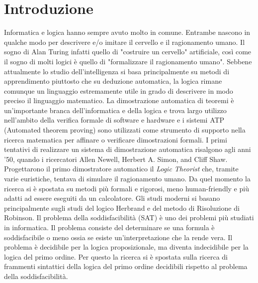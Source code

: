 \documentclass[./main.tex]{subfiles}
\begin{document}
\chapter*{Introduzione}




Informatica e logica hanno sempre avuto molto in comune.
Entrambe nascono in qualche modo per descrivere e/o imitare il cervello e il ragionamento umano. 
Il sogno di Alan Turing infatti quello di "costruire un cervello" artificiale,
così come il sogno di molti logici è quello di "formalizzare il ragionamento umano".
Sebbene attualmente lo studio dell'intelligenza si basa principalmente su metodi di apprendimento 
piuttosto che su deduzione automatica, la logica rimane comunque un linguaggio estremamente utile
in grado di descrivere in modo preciso il linguaggio matematico.
La dimostrazione automatica di teoremi è un'importante branca dell'informatica e della logica
e trova largo utilizzo nell'ambito della verifica formale di software e hardware 
e i sistemi ATP (Automated theorem proving) sono utilizzati come strumento di supporto 
nella ricerca matematica per affinare o verificare dimostrazioni formali.
%
I primi tentativi di realizzare un sistema 
di dimostrazione automatica risalgono agli anni '50,
quando i ricercatori Allen Newell, Herbert A. Simon, and Cliff Shaw.
Progettarono il primo dimostratore automatico il \textit{Logic Theorist}
che, tramite varie euristiche, tentava di simulare il ragionamento umano. 
Da quel momento la ricerca si è spostata su metodi più formali e rigorosi,
meno human-friendly e più adatti ad essere eseguiti da un calcolatore.
Gli studi moderni si basano principalmente sugli studi 
del logico Herbrand e del metodo di Risoluzione di Robinson.
% 
Il problema della soddisfacibilità (SAT) è uno dei problemi più studiati in informatica.
Il problema consiste del determinare se una formula è soddisfacibile o meno ossia 
se esiste un'interpretazione che la rende vera.
Il problema è decidibile per la logica proposizionale, ma diventa indecidibile
per la logica del primo ordine.
Per questo la ricerca si è spostata sulla ricerca di frammenti sintattici della logica del primo ordine
decidibili rispetto al problema della soddisfacibilità.
\end{document}
